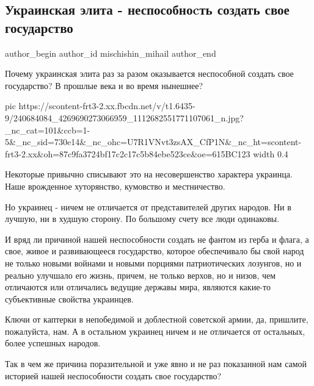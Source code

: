  
 
 
 
 
 
\subsection{Украинская элита - неспособноcть создать свое государство}
\label{sec:29_08_2021.fb.mischishin_mihail.1.elita_ukr_gosudarstvo}
 
\ifcmt
 author_begin
   author_id mischishin_mihail
 author_end
\fi

Почему украинская элита раз за разом оказывается неспособной создать свое
государство? В прошлые века и во время нынешнее?

\ifcmt
  pic https://scontent-frt3-2.xx.fbcdn.net/v/t1.6435-9/240684084_4269690273066959_1112682551771107061_n.jpg?_nc_cat=101&ccb=1-5&_nc_sid=730e14&_nc_ohc=U7R1VNvt3zsAX_CfP1N&_nc_ht=scontent-frt3-2.xx&oh=87c9fa3724bf17c2c17c5b84ebe523ce&oe=615BC123
  width 0.4
\fi

Некоторые привычно списывают это на несовершенство характера украинца. Наше
врожденное хуторянство, кумовство и местничество.

Но украинец - ничем не отличается от представителей других народов. Ни в
лучшую, ни в худшую сторону. По большому счету все люди одинаковы.

И вряд ли причиной нашей неспособности создать не фантом из герба и флага, а
свое, живое и развивающееся государство, которое обеспечивало бы свой народ не
только новыми войнами и новыми порциями патриотических лозунгов, но и реально
улучшало его жизнь, причем, не только верхов, но и низов, чем отличаются или
отличались ведущие державы мира, являются какие-то субъективные свойства
украинцев.

Ключи от каптерки в непобедимой и доблестной советской армии, да, пришлите,
пожалуйста, нам. А в остальном украинец ничем и не отличается от остальных,
более успешных народов.

Так в чем же причина поразительной и уже явно и не раз показанной нам самой
историей нашей неспособности создать свое государство?

